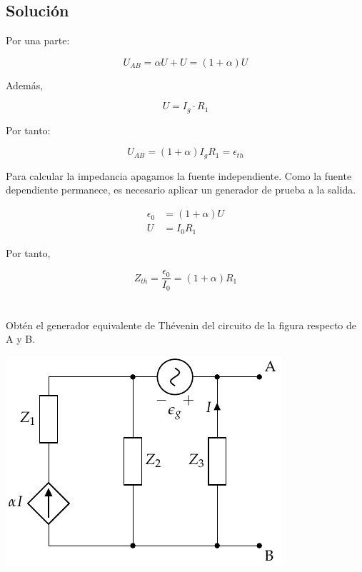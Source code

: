 \documentclass[12pt]{article}
\begin{document}
\noindent\hrulefill

\subsection*{Solución}

Por una parte:

\begin{equation*}
  U_{AB} = \alpha U + U = (1 + \alpha) U
\end{equation*}

Además,

\begin{equation*}
  U = I_g \cdot R_1
\end{equation*}

Por tanto:

\begin{equation*}
  U_{AB} = (1 + \alpha) I_g R_1 = \epsilon_{th}
\end{equation*}

Para calcular la impedancia apagamos la fuente independiente. Como la fuente dependiente permanece, es necesario aplicar un generador de prueba a la salida.

\begin{align*}
  \epsilon_0 &= (1 + \alpha) U\\
  U &= I_0 R_1
\end{align*}

Por tanto,

\begin{equation*}
  Z_{th} = \frac{\epsilon_0}{I_0} = (1 + \alpha) R_1
\end{equation*}

\clearpage

\section{}

Obtén el generador equivalente de Thévenin del circuito de la figura respecto de A y B.

\begin{center}
\includegraphics{figs/Thevenin4}
\end{center}
\end{document}
